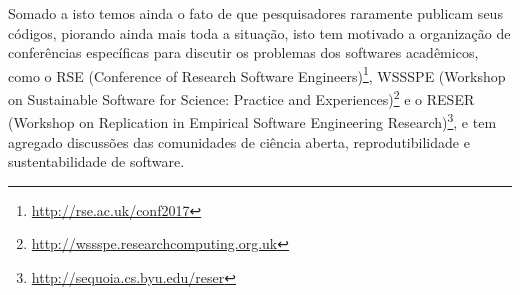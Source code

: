 %
% 
% 
% 
%
%

Somado a isto temos ainda o fato de que pesquisadores raramente publicam seus
códigos, piorando ainda mais toda a situação, isto tem motivado a organização
de conferências específicas para discutir os problemas dos softwares
acadêmicos, como o RSE (Conference of Research Software Engineers)\footnote{
\url{http://rse.ac.uk/conf2017}}, WSSSPE (Workshop on Sustainable Software for
Science: Practice and Experiences)\footnote{
\url{http://wssspe.researchcomputing.org.uk}} e o RESER (Workshop on
Replication in Empirical Software Engineering Research)\footnote{
\url{http://sequoia.cs.byu.edu/reser}}, e tem agregado discussões das
comunidades de ciência aberta, reprodutibilidade e sustentabilidade de
software.

